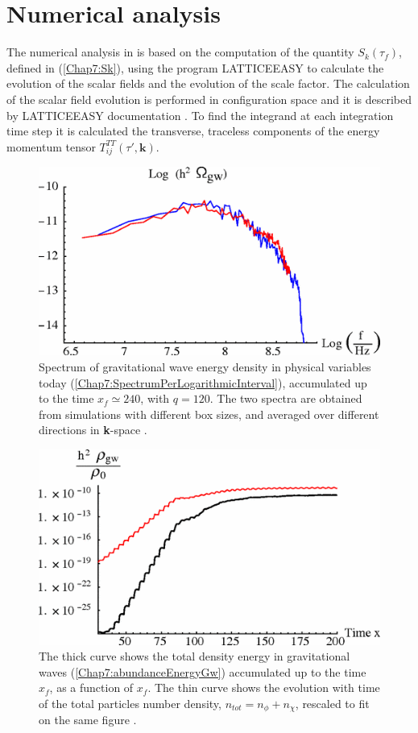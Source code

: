 \documentclass[11pt,a4paper,twoside]{book}
\begin{document}
\section{Numerical analysis}
The numerical analysis in \cite{Chap7:GreenMethod} is based on the computation of the quantity $ S_{k}(\tau_{f}) $, defined in (\ref{Chap7:Sk}), using the program LATTICEEASY to calculate the evolution of the scalar fields and the evolution of the scale factor. The calculation of the scalar field evolution is performed in configuration space and it is described by LATTICEEASY documentation \cite{Chap5:Latticeeasy}. To find the integrand at each integration time step it is calculated the transverse, traceless components of the energy momentum tensor $  T_{ij}^{TT} (\tau',\textbf{k})$.

\begin{figure}
	\centering
	\includegraphics[width=0.65\linewidth, height=0.3\textheight]{Images/Chap7/GreenMethod_Fig4}
	\caption{Spectrum of gravitational wave energy density in physical variables today (\ref{Chap7:SpectrumPerLogarithmicInterval}), accumulated up to the time $ x_{f}\simeq 240 $, with $ q=120 $. The two spectra are obtained from simulations with different box sizes, and averaged over different directions in \textbf{k}-space \cite{Chap7:GreenMethod}.}
	\label{fig:greenmethodfig4}
\end{figure}
\begin{figure}
	\centering
	\includegraphics[width=0.65\linewidth, height=0.3\textheight]{Images/Chap7/GreenMethod_Fig5}
	\caption{The thick curve shows the total density energy in gravitational waves (\ref{Chap7:abundanceEnergyGw}) accumulated up to the time $ x_{f} $, as a function of $ x_{f} $. The thin curve shows the evolution with time of the total particles number density, $ n_{tot}=n_{\phi} + n_{\chi} $, rescaled to fit on the same figure \cite{Chap7:GreenMethod}.}
	\label{fig:greenmethodfig5}
\end{figure}
\end{document}
